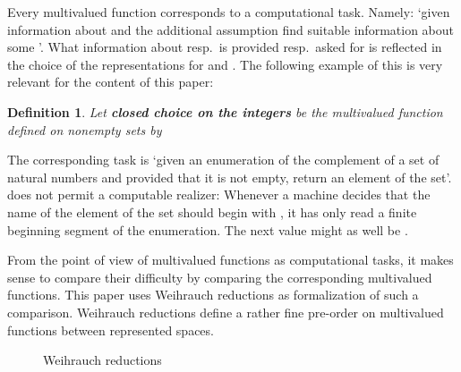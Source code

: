 \documentclass{eptcs-modified}
\newtheorem{definition}[theorem]{Definition}
\newcommand{\demph}{\textbf}
\begin{document}
			Every multivalued function  corresponds to a computational task.
			Namely: \lq given information about  and the additional assumption  find suitable information about some \rq.
			What information about  resp.\  is provided resp.\ asked for is reflected in the choice of the representations for  and .
			The following example of this is very relevant for the content of this paper:
			\begin{definition}
				Let \demph{closed choice on the integers} be the multivalued function  defined on nonempty sets by
				
			\end{definition}
			The corresponding task is \lq given an enumeration of the complement of a set of natural numbers and provided that it is not empty, return an element of the set\rq.
			 does not permit a computable realizer:
			Whenever a machine decides that the name of the element of the set should begin with , it has only read a finite beginning segment of the enumeration.
			The next value might as well be .

			From the point of view of multivalued functions as computational tasks, it makes sense to compare their difficulty by comparing the corresponding multivalued functions.
			This paper uses Weihrauch reductions as formalization of such a comparison.
			Weihrauch reductions define a rather fine pre-order on multivalued functions between represented spaces.

			\begin{wrapfigure}{r}{3.5cm}
				\vspace{-.2cm}
				\caption{Weihrauch reductions}\label{fig:Wheirauch reduction}
				\vspace{-.8cm}
			\end{wrapfigure}
			
\end{document}
